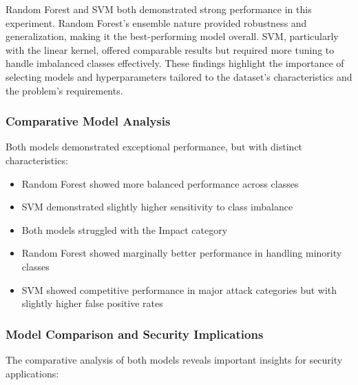         Random Forest and SVM both demonstrated strong performance in this experiment. Random Forest's ensemble nature provided robustness and generalization, making it the best-performing model overall. SVM, particularly with the linear kernel, offered comparable results but required more tuning to handle imbalanced classes effectively. These findings highlight the importance of selecting models and hyperparameters tailored to the dataset's characteristics and the problem's requirements.   
        
    
    \subsubsection{Comparative Model Analysis}
    
        Both models demonstrated exceptional performance, but with distinct characteristics:
        
        \begin{itemize}
            \item Random Forest showed more balanced performance across classes
            \item SVM demonstrated slightly higher sensitivity to class imbalance
            \item Both models struggled with the Impact category
            \item Random Forest showed marginally better performance in handling minority classes
            \item SVM showed competitive performance in major attack categories but with slightly higher false positive rates
        \end{itemize}
    
    
    \subsubsection{Model Comparison and Security Implications}
    
        The comparative analysis of both models reveals important insights for security applications:
        
